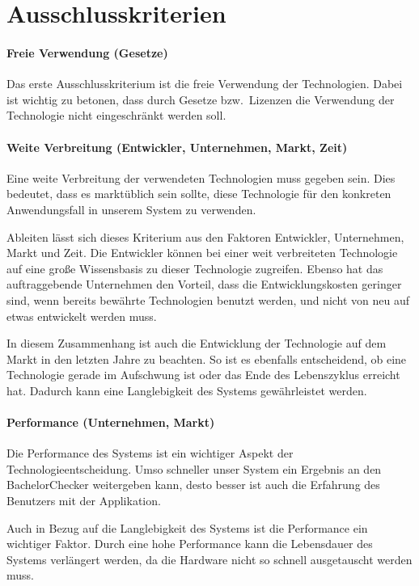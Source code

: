 \section{Ausschlusskriterien}\label{sec:ausschlusskriterien}

\paragraph{Freie Verwendung (Gesetze)}\label{par:freie-verwendung}
Das erste Ausschlusskriterium ist die freie Verwendung der Technologien.
Dabei ist wichtig zu betonen, dass durch Gesetze bzw.\ Lizenzen die
Verwendung der Technologie nicht eingeschränkt werden soll.

\paragraph{Weite Verbreitung (Entwickler, Unternehmen, Markt, Zeit)}\label{par:weite-verbreitung}
Eine weite Verbreitung der verwendeten Technologien muss gegeben sein.
Dies bedeutet, dass es marktüblich sein sollte, diese Technologie für den
konkreten Anwendungsfall in unserem System zu verwenden.

Ableiten lässt sich dieses Kriterium aus den Faktoren Entwickler, Unternehmen, Markt und Zeit.
Die Entwickler können bei einer weit verbreiteten Technologie
auf eine große Wissensbasis zu dieser Technologie zugreifen.
Ebenso hat das auftraggebende Unternehmen den Vorteil, dass die Entwicklungskosten geringer sind,
wenn bereits bewährte Technologien benutzt werden, und nicht von neu auf etwas entwickelt werden muss.

In diesem Zusammenhang ist auch die Entwicklung der Technologie auf dem
Markt in den letzten Jahre zu beachten.
So ist es ebenfalls entscheidend, ob eine Technologie gerade im Aufschwung
ist oder das Ende des Lebenszyklus erreicht hat.
Dadurch kann eine Langlebigkeit des Systems gewährleistet werden.

\paragraph{Performance (Unternehmen, Markt)}\label{par:performance}
Die Performance des Systems ist ein wichtiger Aspekt der Technologieentscheidung.
Umso schneller unser System ein Ergebnis an den BachelorChecker weitergeben kann,
desto besser ist auch die Erfahrung des Benutzers mit der Applikation.

Auch in Bezug auf die Langlebigkeit des Systems ist die Performance ein wichtiger Faktor.
Durch eine hohe Performance kann die Lebensdauer des Systems verlängert werden,
da die Hardware nicht so schnell ausgetauscht werden muss.

